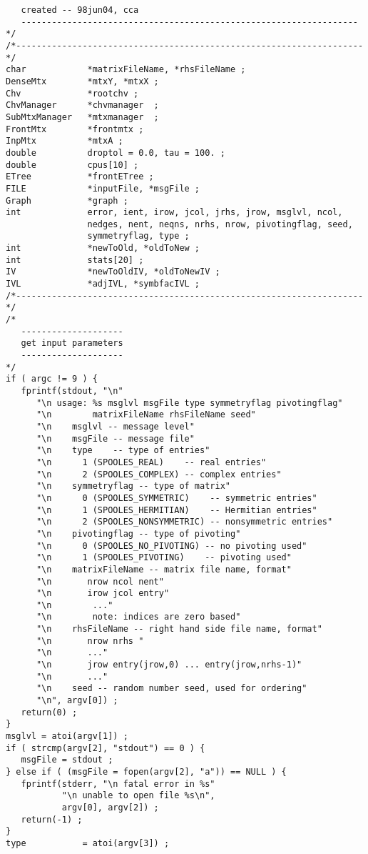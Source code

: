 \begin{verbatim}
   created -- 98jun04, cca
   ------------------------------------------------------------------
*/
/*--------------------------------------------------------------------*/
char            *matrixFileName, *rhsFileName ;
DenseMtx        *mtxY, *mtxX ;
Chv             *rootchv ;
ChvManager      *chvmanager  ;
SubMtxManager   *mtxmanager  ;
FrontMtx        *frontmtx ;
InpMtx          *mtxA ;
double          droptol = 0.0, tau = 100. ;
double          cpus[10] ;
ETree           *frontETree ;
FILE            *inputFile, *msgFile ;
Graph           *graph ;
int             error, ient, irow, jcol, jrhs, jrow, msglvl, ncol, 
                nedges, nent, neqns, nrhs, nrow, pivotingflag, seed, 
                symmetryflag, type ;
int             *newToOld, *oldToNew ;
int             stats[20] ;
IV              *newToOldIV, *oldToNewIV ;
IVL             *adjIVL, *symbfacIVL ;
/*--------------------------------------------------------------------*/
/*
   --------------------
   get input parameters
   --------------------
*/
if ( argc != 9 ) {
   fprintf(stdout, "\n"
      "\n usage: %s msglvl msgFile type symmetryflag pivotingflag"
      "\n        matrixFileName rhsFileName seed"
      "\n    msglvl -- message level"
      "\n    msgFile -- message file"
      "\n    type    -- type of entries"
      "\n      1 (SPOOLES_REAL)    -- real entries"
      "\n      2 (SPOOLES_COMPLEX) -- complex entries"
      "\n    symmetryflag -- type of matrix"
      "\n      0 (SPOOLES_SYMMETRIC)    -- symmetric entries"
      "\n      1 (SPOOLES_HERMITIAN)    -- Hermitian entries"
      "\n      2 (SPOOLES_NONSYMMETRIC) -- nonsymmetric entries"
      "\n    pivotingflag -- type of pivoting"
      "\n      0 (SPOOLES_NO_PIVOTING) -- no pivoting used"
      "\n      1 (SPOOLES_PIVOTING)    -- pivoting used"
      "\n    matrixFileName -- matrix file name, format"
      "\n       nrow ncol nent"
      "\n       irow jcol entry"
      "\n        ..."
      "\n        note: indices are zero based"
      "\n    rhsFileName -- right hand side file name, format"
      "\n       nrow nrhs "
      "\n       ..."
      "\n       jrow entry(jrow,0) ... entry(jrow,nrhs-1)"
      "\n       ..."
      "\n    seed -- random number seed, used for ordering"
      "\n", argv[0]) ;
   return(0) ;
}
msglvl = atoi(argv[1]) ;
if ( strcmp(argv[2], "stdout") == 0 ) {
   msgFile = stdout ;
} else if ( (msgFile = fopen(argv[2], "a")) == NULL ) {
   fprintf(stderr, "\n fatal error in %s"
           "\n unable to open file %s\n",
           argv[0], argv[2]) ;
   return(-1) ;
}
type           = atoi(argv[3]) ;

\end{verbatim}

